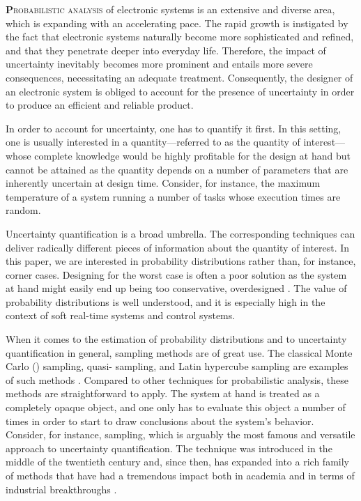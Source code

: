 \lettrine[findent=0.4em, nindent=0em]{\textbf{P}}{robabilistic analysis} of
electronic systems is an extensive and diverse area, which is expanding with an
accelerating pace. The rapid growth is instigated by the fact that electronic
systems naturally become more sophisticated and refined, and that they penetrate
deeper into everyday life. Therefore, the impact of uncertainty inevitably
becomes more prominent and entails more severe consequences, necessitating an
adequate treatment. Consequently, the designer of an electronic system is
obliged to account for the presence of uncertainty in order to produce an
efficient and reliable product.

In order to account for uncertainty, one has to quantify it first. In this
setting, one is usually interested in a quantity---referred to as the quantity
of interest---whose complete knowledge would be highly profitable for the design
at hand but cannot be attained as the quantity depends on a number of parameters
that are inherently uncertain at design time. Consider, for instance, the
maximum temperature of a system running a number of tasks whose execution times
are random.

Uncertainty quantification is a broad umbrella. The corresponding techniques can
deliver radically different pieces of information about the quantity of
interest. In this paper, we are interested in probability distributions rather
than, for instance, corner cases. Designing for the worst case is often a poor
solution as the system at hand might easily end up being too conservative,
overdesigned \cite{quinton2012}. The value of probability distributions is well
understood, and it is especially high in the context of soft real-time systems
and control systems.

When it comes to the estimation of probability distributions and to uncertainty
quantification in general, sampling methods are of great use. The classical
Monte Carlo () sampling, quasi- sampling, and Latin hypercube
sampling are examples of such methods \cite{asmussen2007}. Compared to other
techniques for probabilistic analysis, these methods are straightforward to
apply. The system at hand is treated as a completely opaque object, and one only
has to evaluate this object a number of times in order to start to draw
conclusions about the system's behavior. Consider, for instance, 
sampling, which is arguably the most famous and versatile approach to
uncertainty quantification. The technique was introduced in the middle of the
twentieth century and, since then, has expanded into a rich family of methods
that have had a tremendous impact both in academia and in terms of industrial
breakthroughs \cite{asmussen2007}.

